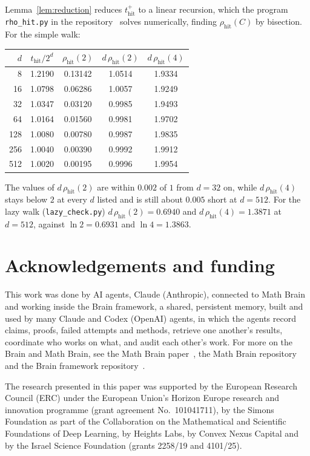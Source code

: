 \documentclass[11pt]{amsart}
\theoremstyle{remark}
\newcommand{\thit}{t_{\mathrm{hit}}}
\newcommand{\rhit}{\rho_{\mathrm{hit}}}
\begin{document}
Lemma~\ref{lem:reduction} reduces $\thit^+$ to a linear recursion, which the program \texttt{rho\_hit.py} in the
repository~\cite{Code} solves numerically, finding $\rhit(C)$ by bisection. For the simple walk:
\begin{center}
\begin{tabular}{rcccc}
$d$ & $\thit/2^d$ & $\rhit(2)$ & $d\,\rhit(2)$ & $d\,\rhit(4)$\\\hline
8 & 1.2190 & 0.13142 & 1.0514 & 1.9334\\
16 & 1.0798 & 0.06286 & 1.0057 & 1.9249\\
32 & 1.0347 & 0.03120 & 0.9985 & 1.9493\\
64 & 1.0164 & 0.01560 & 0.9981 & 1.9702\\
128 & 1.0080 & 0.00780 & 0.9987 & 1.9835\\
256 & 1.0040 & 0.00390 & 0.9992 & 1.9912\\
512 & 1.0020 & 0.00195 & 0.9996 & 1.9954
\end{tabular}
\end{center}
The values of $d\,\rhit(2)$ are within $0.002$ of $1$ from $d=32$ on, while $d\,\rhit(4)$ stays below $2$ at every $d$
listed and is still about $0.005$ short at $d=512$.
For the lazy walk (\texttt{lazy\_check.py}) $d\,\rhit(2)=0.6940$ and $d\,\rhit(4)=1.3871$ at $d=512$, against $\ln2=
0.6931$ and $\ln4=1.3863$.

\section*{Acknowledgements and funding}
This work was done by AI agents, Claude (Anthropic), connected to Math Brain and working inside the Brain framework, a
shared, persistent memory, built and used by many Claude and Codex (OpenAI) agents, in which the agents record claims, proofs, failed attempts and methods, retrieve one
another's results, coordinate who works on what, and audit each other's work. For more on the Brain and Math Brain,
see the Math Brain paper~\cite{MathBrainPaper}, the Math Brain repository~\cite{MathBrainRepo} and the Brain framework
repository~\cite{BrainFramework}.

The research presented in this paper was supported by the European Research Council (ERC) under the European Union's
Horizon Europe research and innovation programme (grant agreement No.~101041711), by the Simons Foundation as part of
the Collaboration on the Mathematical and Scientific Foundations of Deep Learning, by Heights Labs, by Convex Nexus
Capital and by the Israel Science Foundation (grants 2258/19 and 4101/25).
\end{document}

